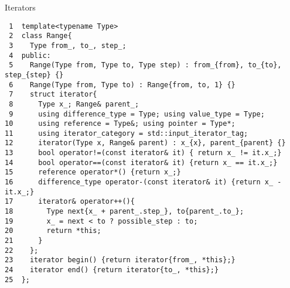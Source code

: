 \documentclass[presentation]{beamer}
\begin{document}
\begin{frame}[label={sec:orgdb8a5e8},fragile]{Iterators}
 \begin{verbatim}
 1  template<typename Type>
 2  class Range{
 3    Type from_, to_, step_;
 4  public:
 5    Range(Type from, Type to, Type step) : from_{from}, to_{to}, step_{step} {}
 6    Range(Type from, Type to) : Range{from, to, 1} {}
 7    struct iterator{
 8      Type x_; Range& parent_;
 9      using difference_type = Type; using value_type = Type;
10      using reference = Type&; using pointer = Type*;
11      using iterator_category = std::input_iterator_tag;
12      iterator(Type x, Range& parent) : x_{x}, parent_{parent} {}
13      bool operator!=(const iterator& it) { return x_ != it.x_;}
14      bool operator==(const iterator& it) {return x_ == it.x_;}
15      reference operator*() {return x_;}
16      difference_type operator-(const iterator& it) {return x_ - it.x_;}
17      iterator& operator++(){
18        Type next{x_ + parent_.step_}, to{parent_.to_};
19        x_ = next < to ? possible_step : to;
20        return *this;
21      }
22    };
23    iterator begin() {return iterator{from_, *this};}
24    iterator end() {return iterator{to_, *this};}
25  };
\end{verbatim}
\end{frame}
\end{document}
